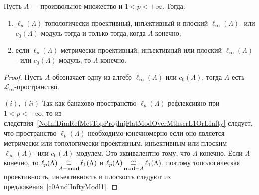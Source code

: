 \begin{proposition}\label{c0AndlInftyModlp} Пусть $\Lambda$ --- произвольное
множество и $1<p<+\infty$. Тогда:

\begin{enumerate}[label = (\roman*)]
    \item $\ell_p(\Lambda)$ топологически проективный, инъективный и плоский
    $\ell_\infty(\Lambda)$- или $c_0(\Lambda)$-модуль тогда и только тогда, 
    когда $\Lambda$ конечно;

    \item если $\ell_p(\Lambda)$ метрически проективный, инъективный или плоский
    $\ell_\infty(\Lambda)$- или $c_0(\Lambda)$-модуль, то $\Lambda$ конечно.
\end{enumerate}
\end{proposition}
\begin{proof} Пусть $A$ обозначает одну из алгебр $\ell_\infty(\Lambda)$ или
$c_0(\Lambda)$, тогда $A$ есть $\mathscr{L}_\infty$-пространство. 

$(i)$, $(ii)$ Так как банахово пространство $\ell_p(\Lambda)$ рефлексивно при
$1<p<+\infty$, то из
следствия~\ref{NoInfDimRefMetTopProjInjFlatModOverMthscrL1OrLInfty} следует, что
пространство $\ell_p(\Lambda)$ необходимо конечномерно если оно является
метрически или топологически проективным, инъективным или плоским
$\ell_\infty(\Lambda)$- или $c_0(\Lambda)$-модулем. Это эквивалентно тому, что
$\Lambda$ конечно. Если $\Lambda$ конечно, то
$\ell_p(\Lambda)\mathop{\mathbin{\cong}}\limits_{A-\mathbf{mod}}\ell_1(\Lambda)$ и
$\ell_p(\Lambda)\mathop{\mathbin{\cong}}\limits_{\mathbf{mod}-A}\ell_1(\Lambda)$, поэтому топологическая
проективность, инъективность и плоскость следуют из
предложения~\ref{c0AndlInftyModl1}.
\end{proof}

